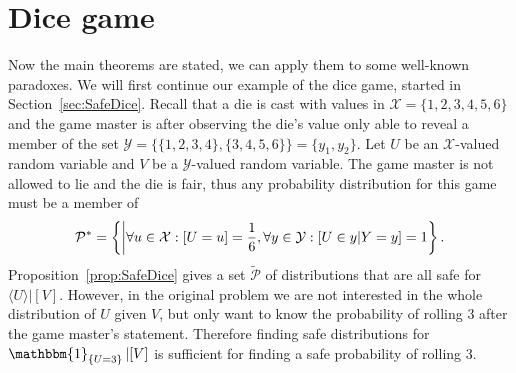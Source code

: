\documentclass[a4paper]{report}
\theoremstyle{plain}
\theoremstyle{definition}
\theoremstyle{remark}
\numberwithin{equation}{chapter}
\let\P\relax
\DeclareMathOperator{\P}{\mathbb{P}}
\DeclareMathOperator{\1}{\mathbbm{1}}
\newcommand{\X}{\mathcal{X}}
\newcommand{\Y}{\mathcal{Y}}
\newcommand{\Pmod}{\mathcal{P}^*}
\newcommand{\DieInd}{\1_{\{U=3\}}}
\begin{document}
\section{Dice game}
Now the main theorems are stated, we can apply them to some well-known paradoxes. We will first continue our example of the dice game, started in Section~\ref{sec:SafeDice}. Recall that a die is cast with values in $\X=\{1,2,3,4,5,6\}$ and the game master is after observing the die's value only able to reveal a member of the set $\Y=\{\{1,2,3,4\},\{3,4,5,6\}\}=\{y_1,y_2\}$. Let $U$ be an $\X$-valued random variable and $V$ be a $\Y$-valued random variable. The game master is not allowed to lie and the die is fair, thus any probability distribution for this game must be a member of \begin{equation}
\Pmod=\left\{\P\middle|\forall u\in\X:\P[U=u]=\frac{1}{6},\forall y\in\Y:\P[U\in y|Y=y]=1\right\}.
\end{equation}
Proposition~\ref{prop:SafeDice} gives a set $\tilde{\mathcal{P}}$ of distributions that are all safe for $\langle U\rangle|[V]$. However, in the original problem we are not interested in the whole distribution of $U$ given $V$, but only want to know the probability of rolling $3$ after the game master's statement. Therefore finding safe distributions for $\DieInd|[V]$ is sufficient for finding a safe probability of rolling $3$.
\end{document}
